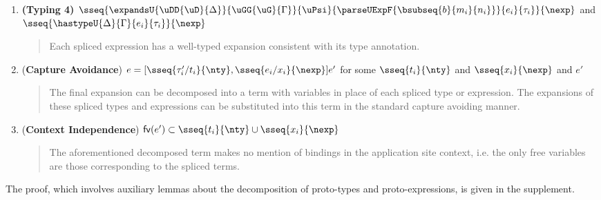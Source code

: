\documentclass[acmsmall,10pt,review,anonymous]{acmart}\settopmatter{printfolios=true}
\begin{document}
\begin{theorem}
\begin{enumerate}[nolistsep]
\begin{quote}
    \end{quote}
\item \textbf{(Typing 4)} $\sseq{
  \expandsU
    {\uDD{\uD}{\Delta}}
    {\uGG{\uG}{\Gamma}}
    {\uPsi}
    {\parseUExpF{\bsubseq{b}{m_i}{n_i}}}
    {e_i}
    {\tau_i}
}{\nexp}$ and $\sseq{\hastypeU{\Delta}{\Gamma}{e_i}{\tau_i}}{\nexp}$
    \begin{quote}
      Each spliced expression has a well-typed expansion consistent with its type annotation.
    \end{quote}
\item (\textbf{Capture Avoidance}) $e = [\sseq{\tau'_i/t_i}{\nty}, \sseq{e_i/x_i}{\nexp}]e'$ for some $\sseq{t_i}{\nty}$ and $\sseq{x_i}{\nexp}$ and $e'$
    \begin{quote}
      The final expansion can be decomposed into a  term with variables in place of each spliced type or expression. The expansions of these spliced types and expressions can be substituted into this term in the standard capture avoiding manner.
    \end{quote}
\item (\textbf{Context Independence}) $\mathsf{fv}(e') \subset \sseq{t_i}{\nty} \cup \sseq{x_i}{\nexp}$
    \begin{quote}
      The aforementioned decomposed term makes no mention of bindings in the application site context, i.e. the only free variables are those corresponding to the spliced terms.
    \end{quote}
\end{enumerate}
\end{theorem}
The proof, which involves auxiliary lemmas about the decomposition of proto-types and proto-expressions, is given in the supplement.
\end{document}
